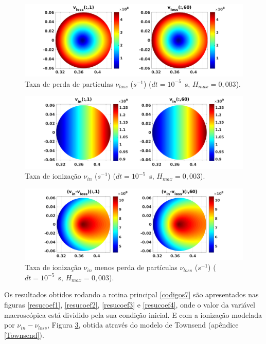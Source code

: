 \documentclass[12pt,oneside,a4paper]{abntex2}
\begin{document}
\begin{figure}[H]
\centering
\includegraphics[scale=0.5]{../SImulacao_breakdown/PDE/vinl1.png}  
\caption{Taxa de perda de partículas $\nu_{loss}$ ($s^{-1}$) ($dt=10^{-5}$\ s, $H_{max} = 0,003$).}
\label{vinn1}
\end{figure}
\begin{figure}[H]
\centering
\includegraphics[scale=0.5]{../SImulacao_breakdown/PDE/vinv1.png}  
\caption{Taxa de ionização $\nu_{in}$ ($s^{-1}$) ($dt=10^{-5}$\ s, $H_{max} = 0,003$).}
\label{vinn2}
\end{figure}
\begin{figure}[H]
\centering
\includegraphics[scale=0.5]{../SImulacao_breakdown/PDE/vinvloss1.png}  
\caption{Taxa de ionização $\nu_{in}$ menos perda de partículas $\nu_{loss}$ ($s^{-1}$) ($dt=10^{-5}$\ s, $H_{max} = 0,003$).}
\label{vinn3}
\end{figure}
\noindent Os resultados obtidos rodando a rotina principal \ref{codigos7} são apresentados nas figuras \ref{resucoef1}, \ref{resucoef2}, \ref{resucoef3} e \ref{resucoef4}, onde o valor da variável macroscópica está dividido pela sua condição inicial. E com a ionização modelada por $\nu_{in}-\nu_{loss}$, Figura \ref{vinn3}, obtida através do modelo de Townsend (apêndice \ref{Townsend}). %
\end{document}
